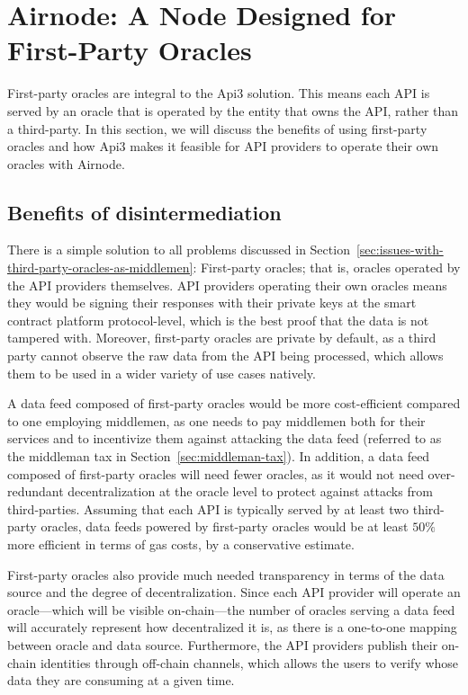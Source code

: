 \documentclass[11pt]{article}
\begin{document}
\section{Airnode: A Node Designed for First-Party Oracles}
\label{sec:airnode-a-node-designed-for-first-party-oracles}

First-party oracles are integral to the Api3 solution.
This means each API is served by an oracle that is operated by the entity that owns the API, rather than a third-party.
In this section, we will discuss the benefits of using first-party oracles and how Api3 makes it feasible for API providers to operate their own oracles with Airnode.

\subsection{Benefits of disintermediation}
\label{sec:benefits-of-disintermediation}

There is a simple solution to all problems discussed in Section~\ref{sec:issues-with-third-party-oracles-as-middlemen}: First-party oracles; that is, oracles operated by the API providers themselves.
API providers operating their own oracles means they would be signing their responses with their private keys at the smart contract platform protocol-level, which is the best proof that the data is not tampered with.
Moreover, first-party oracles are private by default, as a third party cannot observe the raw data from the API being processed, which allows them to be used in a wider variety of use cases natively.

A data feed composed of first-party oracles would be more cost-efficient compared to one employing middlemen, as one needs to pay middlemen both for their services and to incentivize them against attacking the data feed (referred to as the middleman tax in Section~\ref{sec:middleman-tax}).
In addition, a data feed composed of first-party oracles will need fewer oracles, as it would not need over-redundant decentralization at the oracle level to protect against attacks from third-parties.
Assuming that each API is typically served by at least two third-party oracles, data feeds powered by first-party oracles would be at least $50\%$ more efficient in terms of gas costs, by a conservative estimate.

First-party oracles also provide much needed transparency in terms of the data source and the degree of decentralization.
Since each API provider will operate an oracle---which will be visible on-chain---the number of oracles serving a data feed will accurately represent how decentralized it is, as there is a one-to-one mapping between oracle and data source.
Furthermore, the API providers publish their on-chain identities through off-chain channels, which allows the users to verify whose data they are consuming at a given time.
\end{document}
